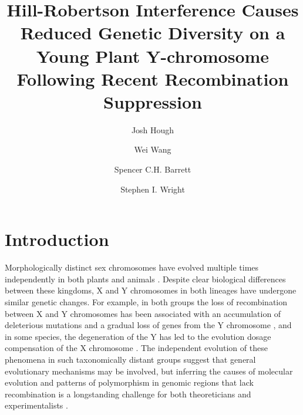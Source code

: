 \documentclass[9pt,twocolumn,twoside]{gsajnl}
\title{Hill-Robertson Interference Causes Reduced Genetic Diversity on a Young Plant Y-chromosome Following Recent Recombination Suppression}
\author[$\ast$,$\dagger$,1]{Josh Hough}
\author[$\dagger$]{Wei Wang}
\author[$\dagger$]{Spencer C.H. Barrett}
\author[$\dagger$]{Stephen I. Wright}
\affil[$\ast$]{Department of Plant Sciences, University of California, Davis}
\affil[$\dagger$]{Department of Ecology and Evolutionary Biology, University of Toronto}
\begin{document}
\maketitle
\thispagestyle{firststyle}
\marginmark
\firstpagefootnote
{}
\vspace{-11pt}

\section*{Introduction}

\lettrine[lines=2]{\color{color2}M}{}orphologically distinct sex chromosomes have evolved multiple times independently in both plants and animals \citep{westergaard1958,ohno1967,bull1983,charlesworth1991,charlesworth2015plant}. Despite clear biological differences between these kingdoms, X and Y chromosomes in both lineages have undergone similar genetic changes. For example, in both groups the loss of recombination between X and Y chromosomes has been associated with an accumulation of deleterious mutations and a gradual loss of genes from the Y chromosome \citep{hough2014,bergero2015,bachtrog2013NRG}, and in some species, the degeneration of the Y has led to the evolution dosage compensation of the X chromosome \citep{charlesworth1996CB,muyle2012,mank2013sex,papadopulos2015}. The independent evolution of these phenomena in such taxonomically distant groups suggest that general evolutionary mechanisms may be involved, but inferring the causes of molecular evolution and patterns of polymorphism in genomic regions that lack recombination is a longstanding challenge for both theoreticians and experimentalists \citep{charlesworth1978,feldman1980evolution,barton1995general,charlesworth1996CB,otto1997deleterious,charlesworth2000degeneration,mcvean2000effects}.
\end{document}
